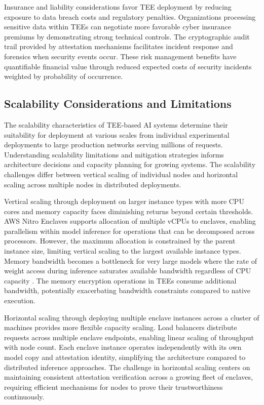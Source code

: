 Insurance and liability considerations favor TEE deployment by reducing exposure to data breach costs and regulatory penalties. Organizations processing sensitive data within TEEs can negotiate more favorable cyber insurance premiums by demonstrating strong technical controls. The cryptographic audit trail provided by attestation mechanisms facilitates incident response and forensics when security events occur. These risk management benefits have quantifiable financial value through reduced expected costs of security incidents weighted by probability of occurrence.

\subsection{Scalability Considerations and Limitations}

The scalability characteristics of TEE-based AI systems determine their suitability for deployment at various scales from individual experimental deployments to large production networks serving millions of requests. Understanding scalability limitations and mitigation strategies informs architecture decisions and capacity planning for growing systems. The scalability challenges differ between vertical scaling of individual nodes and horizontal scaling across multiple nodes in distributed deployments.

Vertical scaling through deployment on larger instance types with more CPU cores and memory capacity faces diminishing returns beyond certain thresholds. AWS Nitro Enclaves supports allocation of multiple vCPUs to enclaves, enabling parallelism within model inference for operations that can be decomposed across processors. However, the maximum allocation is constrained by the parent instance size, limiting vertical scaling to the largest available instance types. Memory bandwidth becomes a bottleneck for very large models where the rate of weight access during inference saturates available bandwidth regardless of CPU capacity \cite{memory_bandwidth}. The memory encryption operations in TEEs consume additional bandwidth, potentially exacerbating bandwidth constraints compared to native execution.

Horizontal scaling through deploying multiple enclave instances across a cluster of machines provides more flexible capacity scaling. Load balancers distribute requests across multiple enclave endpoints, enabling linear scaling of throughput with node count. Each enclave instance operates independently with its own model copy and attestation identity, simplifying the architecture compared to distributed inference approaches. The challenge in horizontal scaling centers on maintaining consistent attestation verification across a growing fleet of enclaves, requiring efficient mechanisms for nodes to prove their trustworthiness continuously.

